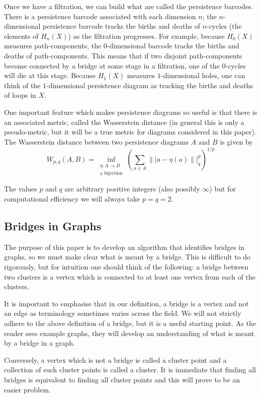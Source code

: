 \documentclass[12pt,a4paper]{amsart}
\numberwithin{equation}{section}
\theoremstyle{plain}
\theoremstyle{definition}
\begin{document}
Once we have a filtration, we can build what are called the persistence barcodes. There is a persistence barcode associated with each dimension $n$; the $n$-dimensional persistence barcode tracks the births and deaths of $n$-cycles (the elements of $H_n(X)$) as the filtration progresses. For example, because $H_0(X)$ measures path-components, the $0$-dimensional barcode tracks the births and deaths of path-components. This means that if two disjoint path-components become connected by a bridge at some stage in a filtration, one of the $0$-cycles will die at this stage. Because $H_1(X)$ measures $1$-dimensional holes, one can think of the $1$-dimensional persistence diagram as tracking the births and deaths of loops in $X$.

One important feature which makes persistence diagrams so useful is that there is an associated metric, called the Wasserstein distance (in general this is only a pseudo-metric, but it will be a true metric for diagrams considered in this paper). The Wasserstein distance between two persistence diagrams $A$ and $B$ is given by
\[W_{p,q}(A,B)= \inf_{\substack{\eta: A \to B \\ \mbox{a bijection}}} \left(\sum_{a \in A} \|| a-\eta(a)\||^p_q \right)^{1/p} \]

The values $p$ and $q$ are arbitrary positive integers (also possibly $\infty$) but for computational efficiency we will always take $p=q=2$. 


\subsection{Bridges in Graphs}

The purpose of this paper is to develop an algorithm that identifies bridges in graphs, so we must make clear what is meant by a bridge. This is difficult to do rigorously, but for intuition one should think of the following: a bridge between two clusters is a vertex which is connected to at least one vertex from each of the clusters.

It is important to emphasise that in our definition, a bridge is a vertex and not an edge as terminology sometimes varies across the field. We will not strictly adhere to the above definition of a bridge, but it is a useful starting point. As the reader sees example graphs, they will develop an understanding of what is meant by a bridge in a graph.

Conversely, a vertex which is not a bridge is called a cluster point and a collection of such cluster points is called a cluster. It is immediate that finding all bridges is equivalent to finding all cluster points and this will prove to be an easier problem.
\end{document}
